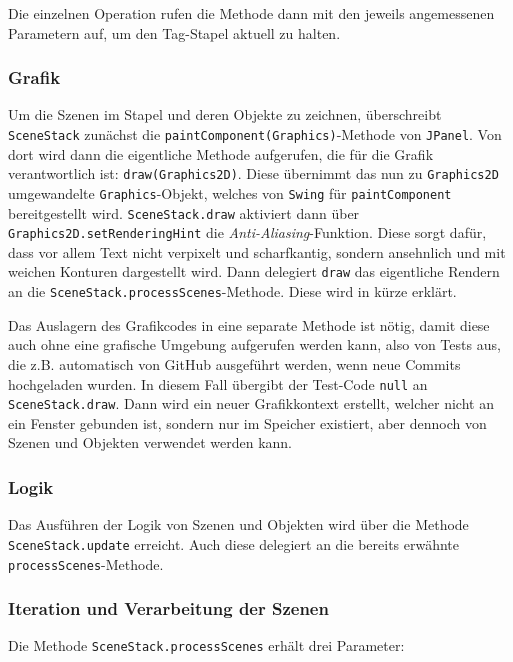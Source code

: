 \begin{sloppypar}
Die einzelnen Operation rufen die Methode dann mit den jeweils angemessenen
Parametern auf, um den Tag-Stapel aktuell zu halten.


\subsubsection{Grafik}

Um die Szenen im Stapel und deren Objekte zu zeichnen, überschreibt
\texttt{SceneStack} zunächst die \texttt{paintComponent(Graphics)}-Methode
von \texttt{JPanel}. Von dort wird dann die eigentliche Methode aufgerufen,
die für die Grafik verantwortlich ist: \texttt{draw(Graphics2D)}. Diese
übernimmt das nun zu \texttt{Graphics2D} umgewandelte \texttt{Graphics}-Objekt,
welches von \texttt{Swing} für \texttt{paintComponent} bereitgestellt wird.
\texttt{SceneStack.draw} aktiviert dann über \texttt{Graphics2D.setRenderingHint}
die \textit{Anti-Aliasing}-Funktion. Diese sorgt dafür, dass vor allem Text
nicht verpixelt und scharfkantig, sondern ansehnlich und mit weichen
Konturen dargestellt wird. Dann delegiert \texttt{draw} das eigentliche
Rendern an die \texttt{SceneStack.processScenes}-Methode. Diese wird
in kürze erklärt.

Das Auslagern des Grafikcodes in eine separate Methode ist nötig, damit
diese auch ohne eine grafische Umgebung aufgerufen werden kann, also von
Tests aus, die z.B. automatisch von GitHub ausgeführt werden, wenn neue
Commits hochgeladen wurden. In diesem Fall übergibt der Test-Code \texttt{null}
an \texttt{SceneStack.draw}. Dann wird ein neuer Grafikkontext erstellt,
welcher nicht an ein Fenster gebunden ist, sondern nur im Speicher existiert,
aber dennoch von Szenen und Objekten verwendet werden kann.


\subsubsection{Logik}

Das Ausführen der Logik von Szenen und Objekten wird
über die Methode \texttt{SceneStack.update} erreicht.
Auch diese delegiert an die bereits erwähnte
 \texttt{processScenes}-Methode.


\subsubsection{Iteration und Verarbeitung der Szenen} \label{programm:engine:szene:stapel:iteration}

Die Methode \texttt{SceneStack.processScenes} erhält drei Parameter:


\end{sloppypar}
